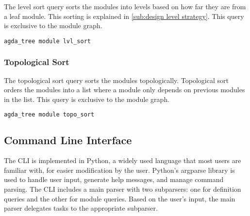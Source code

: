 The level sort query sorts the modules into levels based on how far they are
from a leaf module. This sorting is explained in \cref{sub:design level
strategy}. This query is exclusive to the module graph. 

\begin{lstlisting}
agda_tree module lvl_sort
\end{lstlisting}

\subsubsection{Topological Sort}

The topological sort query sorts the modules topologically. Topological sort
orders the modules into a list where a module only depends on previous modules
in the list. This query is exclusive to the module graph. 

\begin{lstlisting}
agda_tree module topo_sort
\end{lstlisting}


\subsection{Command Line Interface}\label{sub:Agda Tree CLI}

The CLI is implemented in Python, a widely used language that most users are
familiar with, for easier modification by the user. Python's
argparse library is used to handle user input, generate help messages, and
manage command parsing. The CLI includes a main parser with two subparsers: one
for definition queries and the other for module queries. Based on the user’s
input, the main parser delegates tasks to the appropriate subparser.

